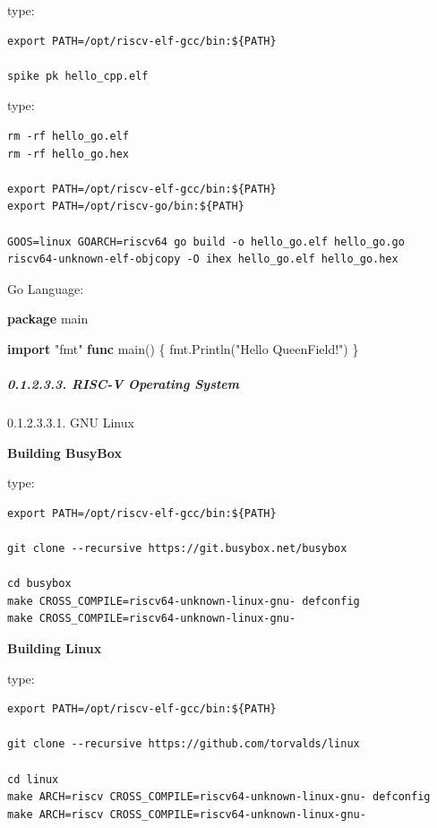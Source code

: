 \documentclass[
]{article}
\newenvironment{Shaded}{}{}
\newcommand{\KeywordTok}[1]{\textcolor[rgb]{0.00,0.44,0.13}{\textbf{#1}}}
\newcommand{\NormalTok}[1]{#1}
\newcommand{\StringTok}[1]{\textcolor[rgb]{0.25,0.44,0.63}{#1}}
\begin{document}
type:

\begin{verbatim}
export PATH=/opt/riscv-elf-gcc/bin:${PATH}

spike pk hello_cpp.elf
\end{verbatim}

type:

\begin{verbatim}
rm -rf hello_go.elf
rm -rf hello_go.hex

export PATH=/opt/riscv-elf-gcc/bin:${PATH}
export PATH=/opt/riscv-go/bin:${PATH}

GOOS=linux GOARCH=riscv64 go build -o hello_go.elf hello_go.go
riscv64-unknown-elf-objcopy -O ihex hello_go.elf hello_go.hex
\end{verbatim}

Go Language:

\begin{Shaded}
\begin{Highlighting}[]
\KeywordTok{package}\NormalTok{ main}

\KeywordTok{import} \StringTok{"fmt"}
\KeywordTok{func}\NormalTok{ main() \{}
\NormalTok{  fmt.Println(}\StringTok{"Hello QueenField!"}\NormalTok{)}
\NormalTok{\}}
\end{Highlighting}
\end{Shaded}

\hypertarget{risc-v-operating-system-1}{%
\subparagraph{0.1.2.3.3. RISC-V Operating
System}\label{risc-v-operating-system-1}}

0.1.2.3.3.1. GNU Linux

\textbf{Building BusyBox}

type:

\begin{verbatim}
export PATH=/opt/riscv-elf-gcc/bin:${PATH}

git clone --recursive https://git.busybox.net/busybox

cd busybox
make CROSS_COMPILE=riscv64-unknown-linux-gnu- defconfig
make CROSS_COMPILE=riscv64-unknown-linux-gnu-
\end{verbatim}

\textbf{Building Linux}

type:

\begin{verbatim}
export PATH=/opt/riscv-elf-gcc/bin:${PATH}

git clone --recursive https://github.com/torvalds/linux

cd linux
make ARCH=riscv CROSS_COMPILE=riscv64-unknown-linux-gnu- defconfig
make ARCH=riscv CROSS_COMPILE=riscv64-unknown-linux-gnu-
\end{verbatim}
\end{document}
